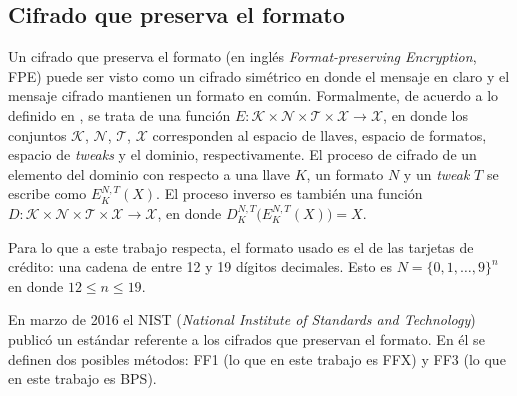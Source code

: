 \subsection{Cifrado que preserva el formato}



Un cifrado que preserva el formato (en inglés \textit{Format-preserving
Encryption}, FPE) puede ser visto como un cifrado simétrico en donde el mensaje
en claro y el mensaje cifrado mantienen un formato en común. Formalmente, de
acuerdo a lo definido en \cite{DBLP:conf/sacrypt/BellareRRS09}, se trata de una
función $ E: \mathcal{K} \times \mathcal{N} \times \mathcal{T} \times
\mathcal{X} \rightarrow \mathcal{X} $, en donde los conjuntos $ \mathcal{K} $, $
\mathcal{N} $, $ \mathcal{T} $, $ \mathcal{X} $ corresponden al espacio de
llaves, espacio de formatos, espacio de \textit{tweaks} y el dominio,
respectivamente. El proceso de cifrado de un elemento del dominio con respecto a
una llave $ K $, un formato $ N $ y un \textit{tweak} $ T $ se escribe como  $
E_K^{N,T}(X) $. El proceso inverso es también una función $ D: \mathcal{K}
\times \mathcal{N} \times \mathcal{T} \times \mathcal{X} \rightarrow \mathcal{X}
$, en donde $ D_K^{N,T}\big( E_K^{N,T}(X) \big) = X $.


Para lo que a este trabajo respecta, el formato usado es el de las tarjetas de
crédito: una cadena de entre 12 y 19 dígitos decimales. Esto es $ N = \{0, 1,
\dots, 9\}^n $ en donde $ 12 \leq n \leq 19 $.


En marzo de 2016 el NIST (\textit{National Institute of Standards and
Technology}) publicó un estándar referente a los cifrados que preservan el
formato\cite{nist_fpe}. En él se definen dos posibles métodos: FF1 (lo que en
este trabajo es FFX) y FF3 (lo que en este trabajo es BPS).

